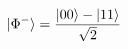 \documentclass[preview]{standalone}
\begin{document}
\begin{align*}
\special{dvisvgm:raw <g id='unique000'>}|\Phi^-\rangle=\frac{|00\rangle-|11\rangle}{\sqrt{2}}\special{dvisvgm:raw </g>}
\end{align*}
\end{document}
